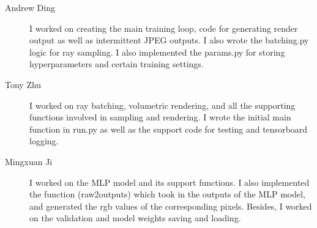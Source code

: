 \begin{description}
\item [Andrew Ding] I worked on creating the main training loop, code for generating render output as well as intermittent JPEG outputs. I also wrote the batching.py logic for ray sampling. I also implemented the params.py for storing hyperparameters and certain training settings.
\item[Tony Zhu] I worked on ray batching, volumetric rendering, and all the supporting functions involved in sampling and rendering. I wrote the initial main function in run.py as well as the support code for testing and tensorboard logging. 
\item[Mingxuan Ji] I worked on the MLP model and its support functions. I also implemented the function (raw2outputs) which took in the outputs of the MLP model, and generated the rgb values of the corresponding pixels. Besides, I worked on the validation and model weights saving and loading.
\end{description}


